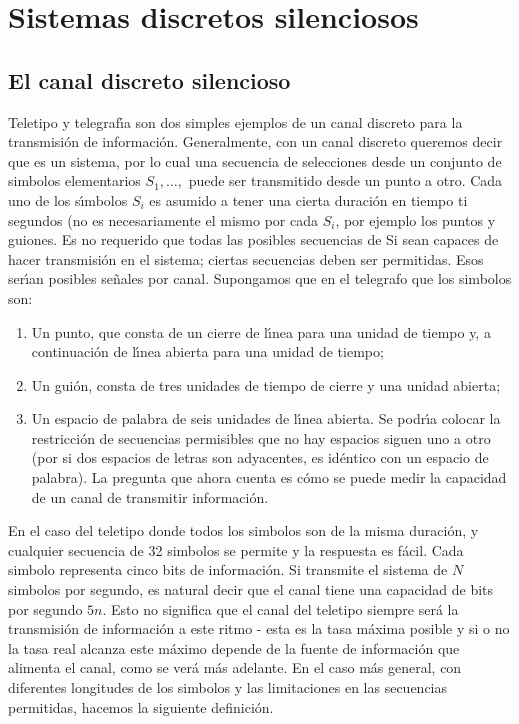 \clearpage

\part{Sistemas discretos silenciosos}
\label{part:1}

\chapter{El canal discreto silencioso}
\label{sec:1}

Teletipo y telegraf\'{\i}a son dos simples ejemplos de un canal
discreto para la transmisi\'{o}n de informaci\'{o}n. Generalmente, con
un canal discreto queremos decir que es un sistema, por lo cual una
secuencia de selecciones desde un conjunto de simbolos elementarios
$S_1,\ldots,$ puede ser transmitido desde un punto a otro. Cada uno de
los s\'{\i}mbolos $S_i$ es asumido a tener una cierta duraci\'{o}n en
tiempo ti segundos (no es necesariamente el mismo por cada $S_i$, por
ejemplo los puntos y guiones. Es no requerido que todas las posibles
secuencias de Si sean capaces de hacer transmisi\'{o}n en el sistema;
ciertas secuencias deben ser permitidas. Esos ser\'{\i}an posibles
se\~{n}ales por canal. Supongamos que en el telegrafo que los simbolos
son: 
\begin{enumerate}
\item{Un punto, que consta de un cierre de l\'{\i}nea para una
unidad de tiempo y, a continuaci\'{o}n de l\'{\i}nea abierta para una
unidad de tiempo;}
\item{Un gui\'{o}n, consta de tres unidades de tiempo
de cierre y una unidad abierta;}
\item{Un espacio de palabra de seis
unidades de l\'{\i}nea abierta. Se podr\'{\i}a colocar la
restricci\'{o}n de secuencias permisibles que no hay espacios siguen
uno a otro (por si dos espacios de letras son adyacentes, es
id\'{e}ntico con un espacio de palabra). La pregunta que ahora cuenta
es c\'{o}mo se puede medir la capacidad de un canal de transmitir
informaci\'{o}n.}
\end{enumerate}

En el caso del teletipo donde todos los simbolos son de la misma
duraci\'{o}n, y cualquier secuencia de 32 simbolos se permite y la
respuesta es f\'{a}cil. Cada simbolo representa cinco bits de
informaci\'{o}n. Si transmite el sistema de $N$ simbolos por segundo,
es natural decir que el canal tiene una capacidad de bits por segundo
$5 n$. Esto no significa que el canal del teletipo siempre ser\'{a} la
transmisi\'{o}n de informaci\'{o}n a este ritmo - esta es la tasa
m\'{a}xima posible y si o no la tasa real alcanza este m\'{a}ximo
depende de la fuente de informaci\'{o}n que alimenta el canal, como se
ver\'{a} m\'{a}s adelante. En el caso m\'{a}s general, con diferentes
longitudes de los simbolos y las limitaciones en las secuencias
permitidas, hacemos la siguiente definici\'{o}n.

